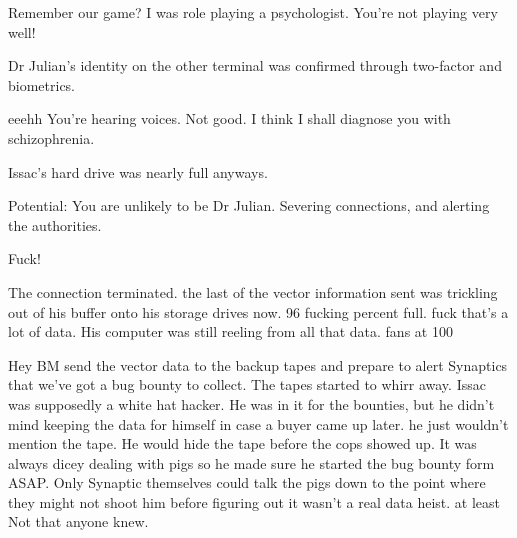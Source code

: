 \begin{receiver}
Remember our game? I was role playing a psychologist. You're not playing very well!
\end{receiver}

\begin{sender}
Dr Julian's identity on the other terminal was confirmed through two\hyp{}factor and biometrics.
\end{sender}

\begin{receiver}
eeehh You're hearing voices. Not good. I think I shall diagnose you with schizophrenia.
\end{receiver}


Issac's hard drive was nearly full anyways.
\newline
\begin{sender}
Potential: You are unlikely to be Dr Julian. Severing connections, and alerting the authorities.
\end{sender}

\begin{receiver}
Fuck!
\end{receiver}

The connection terminated. the last of the vector information sent was trickling out of his buffer onto his storage drives now. 96 fucking percent full. fuck that's a lot of data. His computer was still reeling from all that data. fans at 100%

Hey BM send the vector data to the backup tapes and prepare to alert Synaptics that we've got a bug bounty to collect. The tapes started to whirr away. Issac was supposedly a white hat hacker. He was in it for the bounties, but he didn't mind keeping the data for himself in case a buyer came up later. he just wouldn't mention the tape. He would hide the tape before the cops showed up. It was always dicey dealing with pigs so he made sure he started the bug bounty form ASAP. Only Synaptic themselves could talk the pigs down to the point where they might not shoot him before figuring out it wasn't a real data heist. at least Not that anyone knew.
